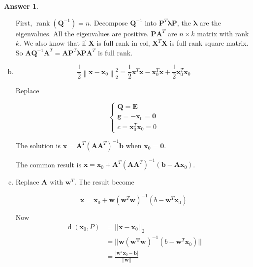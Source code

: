 \documentclass{article}
\theoremstyle{definition}
\newtheorem{ans}{Answer}
\begin{document}
\begin{ans}
\begin{enumerate}[(a)]
			First, $\operatorname{rank}(\boldsymbol Q^{-1})=n$. Decompose $\boldsymbol Q^{-1}$ into $\boldsymbol P^T \boldsymbol\lambda \boldsymbol P$, the $\boldsymbol \lambda $ are the eigenvalues. All the eigenvalues are positive. $\boldsymbol P \boldsymbol A^T$ are $n \times k$ matrix with rank $k$. We also know that if $\boldsymbol X$ is full rank in col, $\boldsymbol X^T \boldsymbol X$ is full rank square matrix. So $\boldsymbol{AQ}^{-1}\boldsymbol{A}^T=\boldsymbol{AP}^T\boldsymbol\lambda\boldsymbol{PA}^T$ is full rank.
			
			\item 
			$$
			\frac{1}{2}\left\|\boldsymbol{x}-\boldsymbol{x}_{0}\right\|_{2}^{2}=\frac{1}{2}\boldsymbol x^T \boldsymbol x - \boldsymbol x_0^T\boldsymbol x + \frac{1}{2}\boldsymbol x_0^T\boldsymbol x_0
			$$

			Replace
			
			$$
			\left\{
			\begin{array}{l}
				\boldsymbol{Q}=\boldsymbol E \\
				\boldsymbol g = \boldsymbol -\boldsymbol x_0 = \boldsymbol 0\\ 
				c = \boldsymbol x_0^T \boldsymbol x_0 = 0
			\end{array}\right.
			$$
			
			The solution is $\boldsymbol x=\boldsymbol{A}^T(\boldsymbol{A}\boldsymbol{A}^T)^{-1}\boldsymbol{b}$ when $\boldsymbol x_0=\boldsymbol 0$.
			
			The common result is $\boldsymbol x=\boldsymbol x_0 + \boldsymbol{A}^T(\boldsymbol{A}\boldsymbol{A}^T)^{-1}(\boldsymbol{b}-\boldsymbol A \boldsymbol x_0)$.
			
			\item Replace $\boldsymbol A \text{ with } \boldsymbol w^T$. The result become 
			
			$$
			\boldsymbol x=\boldsymbol x_0 + \boldsymbol{w}(\boldsymbol{w}^T\boldsymbol{w})^{-1}(b-\boldsymbol w^T \boldsymbol x_0)
			$$
			
			Now 
			$$
			\begin{aligned}
				\operatorname d (\boldsymbol x_0, P)&=||\boldsymbol x - \boldsymbol x_0||_2\\
				&=||\boldsymbol{w}(\boldsymbol{w^T}\boldsymbol{w})^{-1}(b-\boldsymbol w^T \boldsymbol x_0)|| \\
				&=\frac{|\boldsymbol w^T \boldsymbol x_0-\boldsymbol b|}{||\boldsymbol w||}
			\end{aligned}
			$$
		\end{enumerate}
	\end{ans}
\end{document}
